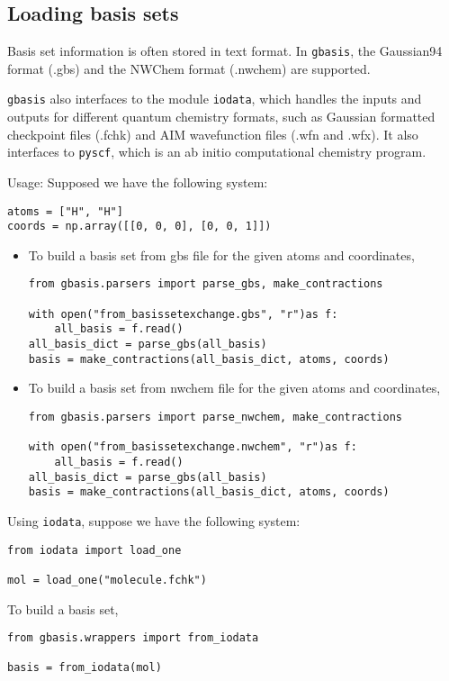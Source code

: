 \documentclass[letterpaper]{article}
\begin{document}
\subsection{Loading basis sets}
Basis set information is often stored in text format.
In \verb|gbasis|, the Gaussian94 format (.gbs) and the NWChem format (.nwchem) are
supported.

\verb|gbasis| also interfaces to the module \verb|iodata|, which handles the
inputs and outputs for different quantum chemistry formats, such as Gaussian
formatted checkpoint files (.fchk) and AIM wavefunction files (.wfn and .wfx).
It also interfaces to \verb|pyscf|, which is an ab initio computational
chemistry program.

Usage:
Supposed we have the following system:
\begin{verbatim}
atoms = ["H", "H"]
coords = np.array([[0, 0, 0], [0, 0, 1]])
\end{verbatim}
\begin{itemize}
\item To build a basis set from gbs file for the given atoms and coordinates,
\begin{verbatim}
from gbasis.parsers import parse_gbs, make_contractions

with open("from_basissetexchange.gbs", "r")as f:
    all_basis = f.read()
all_basis_dict = parse_gbs(all_basis)
basis = make_contractions(all_basis_dict, atoms, coords)
\end{verbatim}
\item To build a basis set from nwchem file for the given atoms and coordinates,
\begin{verbatim}
from gbasis.parsers import parse_nwchem, make_contractions

with open("from_basissetexchange.nwchem", "r")as f:
    all_basis = f.read()
all_basis_dict = parse_gbs(all_basis)
basis = make_contractions(all_basis_dict, atoms, coords)
\end{verbatim}
\end{itemize}

Using \verb|iodata|, suppose we have the following system:
\begin{verbatim}
from iodata import load_one

mol = load_one("molecule.fchk")
\end{verbatim}
To build a basis set,
\begin{verbatim}
from gbasis.wrappers import from_iodata

basis = from_iodata(mol)
\end{verbatim}
\end{document}
